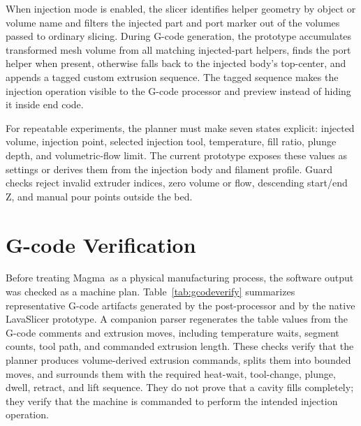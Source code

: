 \documentclass[conference]{IEEEtran}
\newcommand{\magma}{Magma}
\begin{document}
When injection mode is enabled, the slicer identifies helper geometry by object or volume name and filters the injected part and port marker out of the volumes passed to ordinary slicing. During G-code generation, the prototype accumulates transformed mesh volume from all matching injected-part helpers, finds the port helper when present, otherwise falls back to the injected body's top-center, and appends a tagged custom extrusion sequence. The tagged sequence makes the injection operation visible to the G-code processor and preview instead of hiding it inside end code.

For repeatable experiments, the planner must make seven states explicit: injected volume, injection point, selected injection tool, temperature, fill ratio, plunge depth, and volumetric-flow limit. The current prototype exposes these values as settings or derives them from the injection body and filament profile. Guard checks reject invalid extruder indices, zero volume or flow, descending start/end Z, and manual pour points outside the bed.

\section{G-code Verification}
Before treating \magma\ as a physical manufacturing process, the software output was checked as a machine plan. Table~\ref{tab:gcodeverify} summarizes representative G-code artifacts generated by the post-processor and by the native LavaSlicer prototype. A companion parser regenerates the table values from the G-code comments and extrusion moves, including temperature waits, segment counts, tool path, and commanded extrusion length. These checks verify that the planner produces volume-derived extrusion commands, splits them into bounded moves, and surrounds them with the required heat-wait, tool-change, plunge, dwell, retract, and lift sequence. They do not prove that a cavity fills completely; they verify that the machine is commanded to perform the intended injection operation.
\end{document}
